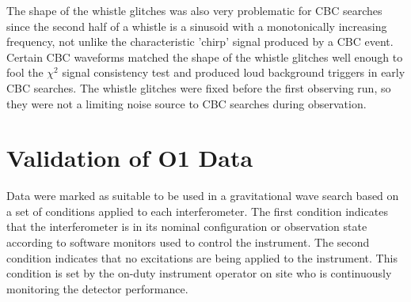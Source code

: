 The shape of the whistle 
glitches was also very problematic for CBC searches since the second half of a 
whistle is a sinusoid with a monotonically increasing frequency, not unlike the 
characteristic 'chirp' signal produced by a CBC event. Certain CBC waveforms 
matched the shape of the whistle glitches well enough to fool the $\chi^2$ signal 
consistency test and produced loud background triggers in early CBC searches. 
The whistle glitches 
were fixed before the first observing run, so they were not a limiting noise source 
to CBC searches during observation.

%
%
%
%
%
%
%
%
%
%

\section{Validation of O1 Data}\label{sec:o1-data}

Data were marked as suitable to be used in a gravitational
wave search based on a set of conditions applied to each interferometer.
The first condition indicates that the interferometer is in its nominal configuration
or observation state according to software monitors used to control the instrument.
The second condition indicates that no
excitations are being applied to the instrument. This condition is set by
the on-duty instrument operator
on site who is continuously monitoring the detector performance.

